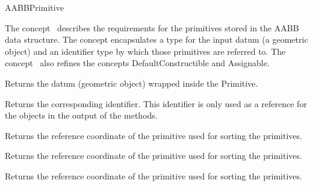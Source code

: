 \ccRefPageBegin


\begin{ccRefConcept}{AABBPrimitive}


\ccDefinition
  
The concept \ccRefName\ describes the requirements for the primitives stored in the AABB data structure. The concept encapsulates a type for the input datum (a geometric object) and an identifier type by which those primitives are referred to. The concept \ccRefName\ also refines the concepts DefaultConstructible and Assignable.

\ccTypes






\ccOperations

{Returns the datum (geometric object) wrapped inside the Primitive.}

{Returns the corresponding identifier. This identifier is only used as a reference for the objects in the output of the  methods.}

{Returns the  reference coordinate of the primitive used for sorting the primitives.}

{Returns the  reference coordinate of the primitive used for sorting the primitives.}

{Returns the  reference coordinate of the primitive used for sorting the primitives.}


\end{ccRefConcept}
